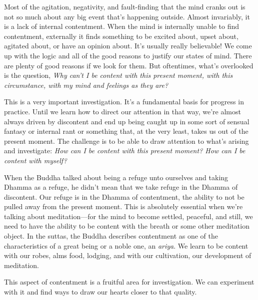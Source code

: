 Most of the agitation, negativity, and fault-finding that the mind 
cranks out is not so much about any big event that's happening outside. 
Almost invariably, it is a lack of internal contentment. When the mind 
is internally unable to find contentment, externally it finds something 
to be excited about, upset about, agitated about, or have an opinion 
about. It's usually really believable! We come up with the logic and 
all of the good reasons to justify our states of mind. There are plenty 
of good reasons if we look for them. But oftentimes, what's overlooked 
is the question, \emph{Why can't I be content with this present moment, 
with this circumstance, with my mind and feelings as they are?}

This is a very important investigation. It's a fundamental basis for 
progress in practice. Until we learn how to direct our attention in 
that way, we're almost always driven by discontent and end up being 
caught up in some sort of sensual fantasy or internal rant or something 
that, at the very least, takes us out of the present moment. The 
challenge is to be able to draw attention to what's arising and 
investigate: \emph{How can I be content with this present moment? How 
can I be content with myself?}

When the Buddha talked about being a refuge unto ourselves and taking 
Dhamma as a refuge, he didn't mean that we take refuge in the Dhamma of 
discontent. Our refuge is in the Dhamma of contentment, the ability to 
not be pulled away from the present moment. This is absolutely 
essential when we're talking about meditation---for the mind to become 
settled, peaceful, and still, we need to have the ability to be content 
with the breath or some other meditation object. In the suttas, the 
Buddha describes contentment as one of the characteristics of a great 
being or a noble one, an \emph{ariya}. We learn to be content with our 
robes, alms food, lodging, and with our cultivation, our development of 
meditation.

This aspect of contentment is a fruitful area for investigation. We can 
experiment with it and find ways to draw our hearts closer to that 
quality.


